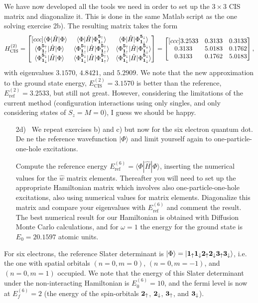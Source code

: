 \documentclass[a4paper]{article}
\newcommand{\bmat}[2]{\begin{bmatrix}[#1] #2 \end{bmatrix}}  %
\renewcommand{\u}[1]{{\bf #1}_\uparrow}
\renewcommand{\d}[1]{{\bf #1}_\downarrow}
\begin{document}
We have now developed all the tools we need in order to set up the $3\times3$ CIS matrix and diagonalize it. This is done in the same {\sc Matlab} script as the one solving exercise 2b). The resulting matrix takes the form
\begin{align}
H_\text{CIS}^{(2)}=\bmat{ccc}{\langle \Phi | \hat{H} | \Phi \rangle & \langle \Phi | \hat{H} | \Phi^{\u{5}}_{\u{1}} \rangle & \langle \Phi | \hat{H} | \Phi^{\d{5}}_{\d{1}} \rangle \\
\langle \Phi^{\u{5}}_{\u{1}} | \hat{H} | \Phi \rangle & \langle \Phi^{\u{5}}_{\u{1}} | \hat{H} | \Phi^{\u{5}}_{\u{1}} \rangle & \langle \Phi^{\u{5}}_{\u{1}} | \hat{H} | \Phi^{\d{5}}_{\d{1}} \rangle \\
\langle \Phi^{\d{5}}_{\d{1}} | \hat{H} | \Phi \rangle & \langle \Phi^{\d{5}}_{\d{1}} | \hat{H} | \Phi^{\u{5}}_{\u{1}} \rangle & \langle \Phi^{\d{5}}_{\d{1}} | \hat{H} | \Phi^{\d{5}}_{\d{1}} \rangle} = \bmat{ccc}{3.2533 & 0.3133 & 0.3133 \\
0.3133 & 5.0183 & 0.1762\\
0.3133 & 0.1762 & 5.0183},
\end{align}
with eigenvalues $3.1570$, $4.8421$, and $5.2909$. We note that the new approximation to the ground state energy, $E_\text{CIS}^{(2)}=3.1570$ is better than the reference, $E_\text{ref}^{(2)}=3.2533$, but still not great. However, considering the limitations of the current method (configuration interactions using only singles, and only considering states of $S_z=M=0$), I guess we should be happy.

\begin{exframe}
\begin{itemize}
  \item[2d)] We repeat exercises b) and c) but now for the six electron quantum dot. De ne the reference wavefunction $|\Phi\rangle$ and limit yourself again to one-particle-one-hole excitations.

  Compute the reference energy $E_\text{ref}^{(6)}=\langle \Phi|\hat{H}|\Phi\rangle$, inserting the numerical values for the $\hat w$ matrix elements.  Thereafter you will need to set up the appropriate Hamiltonian matrix which involves also one-particle-one-hole excitations, also using numerical values for matrix elements. Diagonalize this matrix and compare your eigenvalues with $E_\text{ref}^{(6)}$ and comment the result. The best numerical result for our Hamiltonian is obtained with Diffusion Monte Carlo calculations, and for $\omega=1$ the energy for the ground state is $E_0=20.1597$ atomic units.
\end{itemize}
\end{exframe}
For six electrons, the reference Slater determinant is $|\Phi\rangle = |\u{1}\d{1}\u{2}\d{2}\u{3}\d{3}\rangle$, i.e. the one with spatial orbitals $(n=0,m=0)$, $(n=0,m=-1)$, and $(n=0,m=1)$ occupied. We note that the energy of this Slater determinant under the non-interacting Hamiltonian is $E_0^{(6)}=10$, and the fermi level is now at $E_f^{(6)}=2$ (the energy of the spin-orbitals $\u{2}$, $\d{2}$, $\u{3}$, and $\d{3}$).
\end{document}
